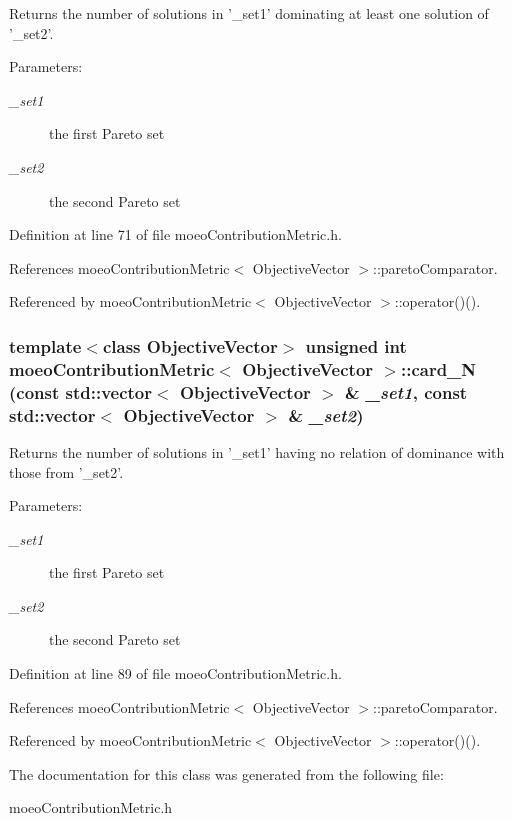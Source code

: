 Returns the number of solutions in '\_\-set1' dominating at least one solution of '\_\-set2'. 

\begin{Desc}
\item[Parameters:]
\begin{description}
\item[{\em \_\-set1}]the first Pareto set \item[{\em \_\-set2}]the second Pareto set \end{description}
\end{Desc}


Definition at line 71 of file moeo\-Contribution\-Metric.h.

References moeo\-Contribution\-Metric$<$ Objective\-Vector $>$::pareto\-Comparator.

Referenced by moeo\-Contribution\-Metric$<$ Objective\-Vector $>$::operator()().
\subsubsection{\setlength{\rightskip}{0pt plus 5cm}template$<$class Objective\-Vector$>$ unsigned int \bf{moeo\-Contribution\-Metric}$<$ Objective\-Vector $>$::card\_\-N (const std::vector$<$ Objective\-Vector $>$ \& {\em \_\-set1}, const std::vector$<$ Objective\-Vector $>$ \& {\em \_\-set2})\hspace{0.3cm}{\tt  [inline, private]}}\label{classmoeoContributionMetric_df26b17120ed2271a6d1ec9c8c77b451}


Returns the number of solutions in '\_\-set1' having no relation of dominance with those from '\_\-set2'. 

\begin{Desc}
\item[Parameters:]
\begin{description}
\item[{\em \_\-set1}]the first Pareto set \item[{\em \_\-set2}]the second Pareto set \end{description}
\end{Desc}


Definition at line 89 of file moeo\-Contribution\-Metric.h.

References moeo\-Contribution\-Metric$<$ Objective\-Vector $>$::pareto\-Comparator.

Referenced by moeo\-Contribution\-Metric$<$ Objective\-Vector $>$::operator()().

The documentation for this class was generated from the following file:\begin{CompactItemize}
\item 
moeo\-Contribution\-Metric.h\end{CompactItemize}
